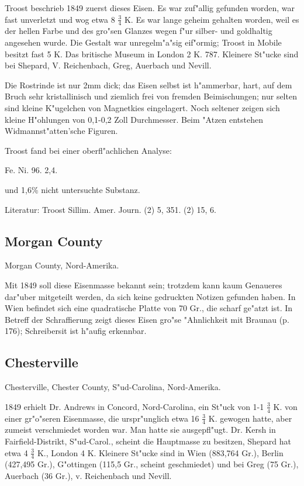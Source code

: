 \documentclass[a4paper, 11pt, oneside]{article}
\begin{document}
Troost beschrieb 1849 zuerst dieses Eisen. Es war zuf"allig gefunden worden, war fast unverletzt und wog etwa 8 $\frac{3}{4}$ K. Es war lange geheim gehalten worden, weil es der hellen Farbe und des gro"sen Glanzes wegen f"ur silber- und goldhaltig angesehen wurde. Die Gestalt war unregelm"a"sig eif"ormig; Troost in Mobile besitzt fast 5 K. Das britische Museum in London 2 K. 787. Kleinere St"ucke sind bei Shepard, V. Reichenbach, Greg, Auerbach und Nevill.

Die Rostrinde ist nur 2mm dick; das Eisen selbst ist h"ammerbar, hart, auf dem Bruch sehr kristallinisch und ziemlich frei von fremden Beimischungen; nur selten sind kleine K"ugelchen von Magnetkies eingelagert. Noch seltener zeigen sich kleine H"ohlungen von 0,1-0,2 Zoll Durchmesser. Beim "Atzen entstehen Widmannst"atten'sche Figuren.

Troost fand bei einer oberfl"achlichen Analyse:

Fe. Ni.  
96. 2,4.

und 1,6\% nicht untersuchte Substanz.

Literatur: Troost Sillim. Amer. Journ. (2) 5, 351. (2) 15, 6.

\subsection{Morgan County}

Morgan County, Nord-Amerika.

Mit 1849 soll diese Eisenmasse bekannt sein; trotzdem kann kaum Genaueres dar"uber mitgeteilt werden, da sich keine gedruckten Notizen gefunden haben. In Wien befindet sich eine quadratische Platte von 70 Gr., die scharf ge"atzt ist. In Betreff der Schraffierung zeigt dieses Eisen gro"se "Ahnlichkeit mit Braunau (p. 176); Schreibersit ist h"aufig erkennbar.

\subsection{Chesterville}

Chesterville, Chester County, S"ud-Carolina, Nord-Amerika.

1849 erhielt Dr. Andrews in Concord, Nord-Carolina, ein St"uck von 1-1 $\frac{3}{4}$ K. von einer gr"o"seren Eisenmasse, die urspr"unglich etwa 16 $\frac{3}{4}$ K. gewogen hatte, aber zumeist verschmiedet worden war. Man hatte sie ausgepfl"ugt. Dr. Kersh in Fairfield-Distrikt, S"ud-Carol., scheint die Hauptmasse zu besitzen, Shepard hat etwa 4 $\frac{3}{4}$ K., London 4 K. Kleinere St"ucke sind in Wien (883,764 Gr.), Berlin (427,495 Gr.), G"ottingen (115,5 Gr., scheint geschmiedet) und bei Greg (75 Gr.), Auerbach (36 Gr.), v. Reichenbach und Nevill.
\end{document}
